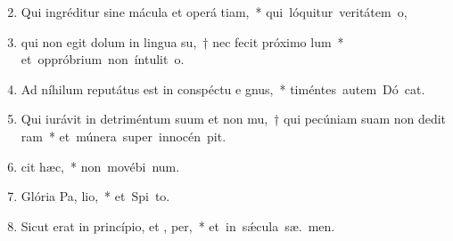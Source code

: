 \begin{flushleft}
\begin{enumerate}[leftmargin=*]
\setcounter{enumi}{1}

\item Qui ingréditur sine mácula et operá tiam,~* \mbox{qui lóquitur veritátem   o,}

\item qui non egit dolum in lingua su,~† nec fecit próximo  lum~* \mbox{et oppróbrium non íntulit  o.}

\item Ad níhilum reputátus est in conspéctu e gnus,~* \mbox{timéntes autem Dó cat.}

\item Qui iurávit in detriméntum suum et non mu,~† qui pecúniam suam non dedit  ram~* \mbox{et múnera super innocén  pit.}

\item {} cit hæc,~* \mbox{non movébi  num.}

\item Glória Pa,  lio,~* \mbox{et Spi to.}

\item Sicut erat in princípio, et ,  per,~* \mbox{et in s\'{\ae}cula sæ. men.}

\end{enumerate}
\end{flushleft}

